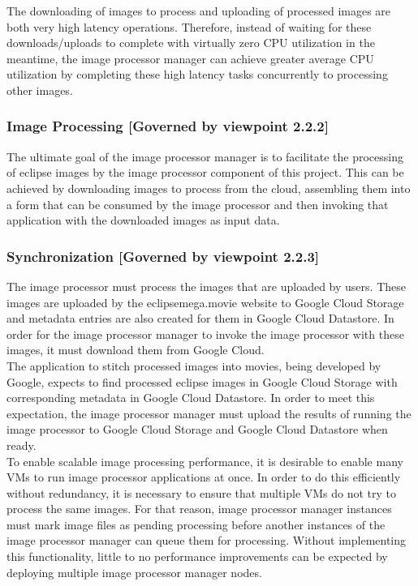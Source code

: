 \documentclass[10pt, onecolumn, draftclsnofoot, letterpaper, compsoc]{IEEEtran}
\begin{document}
    The downloading of images to process and uploading of processed images are both very high latency
    operations. Therefore, instead of waiting for these downloads/uploads to complete with virtually zero CPU
    utilization in the meantime, the image processor manager can achieve greater average CPU utilization by
    completing these high latency tasks concurrently to processing other images. \\

    \subsubsection{Image Processing [Governed by viewpoint 2.2.2]}
    The ultimate goal of the image processor manager is to facilitate the processing of eclipse images by the
    image processor component of this project. This can be achieved by downloading images to process from the
    cloud, assembling them into a form that can be consumed by the image processor and then invoking that
    application with the downloaded images as input data. \\

    \subsubsection{Synchronization [Governed by viewpoint 2.2.3]}
    The image processor must process the images that are uploaded by users. These images are uploaded by the
    eclipsemega.movie website to Google Cloud Storage and metadata entries are also created for them in Google
    Cloud Datastore. In order for the image processor manager to invoke the image processor with these images,
    it must download them from Google Cloud. \\

    The application to stitch processed images into movies, being developed by Google, expects to find
    processed eclipse images in Google Cloud Storage with corresponding metadata in Google Cloud Datastore. In
    order to meet this expectation, the image processor manager must upload the results of running the image
    processor to Google Cloud Storage and Google Cloud Datastore when ready. \\

    To enable scalable image processing performance, it is desirable to enable many VMs to run image processor
    applications at once. In order to do this efficiently without redundancy, it is necessary to ensure that
    multiple VMs do not try to process the same images. For that reason, image processor manager instances must
    mark image files as pending processing before another instances of the image processor manager can queue
    them for processing. Without implementing this functionality, little to no performance improvements can be
    expected by deploying multiple image processor manager nodes. \\
\end{document}

